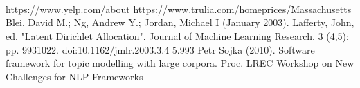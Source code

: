 \documentclass[a4paper]{article}
\begin{document}
\
\\
\\
\\
\\
\\
\\
\\
\\
\\
\\
\\
\\
\\
\\
\\
\\
\\
\\
\\
\\



\begin{thebibliography}{9}
 https://www.yelp.com/about
 https://www.trulia.com/homeprices/Massachusetts
 Blei, David M.; Ng, Andrew Y.; Jordan, Michael I (January 2003). Lafferty, John, ed. "Latent Dirichlet Allocation". Journal of Machine Learning Research. 3 (4,5): pp. 9931022. doi:10.1162/jmlr.2003.3.4 5.993
 \bibitem{nano3}
Petr Sojka (2010). Software framework for topic modelling with large corpora. Proc. LREC Workshop on New Challenges for NLP Frameworks
\end{thebibliography}
\end{document}

